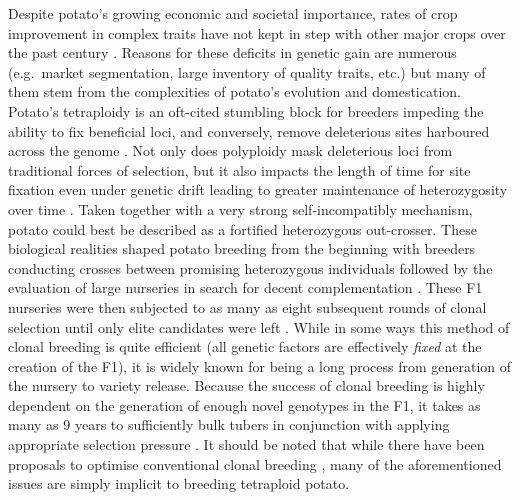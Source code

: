 \begin{refsection}
Despite potato's growing economic and societal importance, rates of crop improvement in complex traits have not kept in step with other major crops over the past century \parencite{Douches1996, Hirsch2013}. Reasons for these deficits in genetic gain are numerous (e.g.~market segmentation, large inventory of quality traits, etc.) but many of them stem from the complexities of potato's evolution and domestication. Potato's tetraploidy is an oft-cited stumbling block for breeders impeding the ability to fix beneficial loci, and conversely, remove deleterious sites harboured across the genome \parencite{Lian2019, Zhang2019}. Not only does polyploidy mask deleterious loci from traditional forces of selection, but it also impacts the length of time for site fixation even under genetic drift leading to greater maintenance of heterozygosity over time \parencite{Bartlett1934}. Taken together with a very strong self-incompatibly mechanism, potato could best be described as a fortified heterozygous out-crosser. These biological realities shaped potato breeding from the beginning with breeders conducting crosses between promising heterozygous individuals followed by the evaluation of large nurseries in search for decent complementation \parencite{Simmonds1979}. These F1 nurseries were then subjected to as many as eight subsequent rounds of clonal selection until only elite candidates were left \parencite{Bradshaw2017}. While in some ways this method of clonal breeding is quite efficient (all genetic factors are effectively \emph{fixed} at the creation of the F1), it is widely known for being a long process from generation of the nursery to variety release. Because the success of clonal breeding is highly dependent on the generation of enough novel genotypes in the F1, it takes as many as 9 years to sufficiently bulk tubers in conjunction with applying appropriate selection pressure \parencite{Bryan1981, Tai1984}. It should be noted that while there have been proposals to optimise conventional clonal breeding \parencite{Neele1991, Bradshaw2003}, many of the aforementioned issues are simply implicit to breeding tetraploid potato.


\end{refsection}
